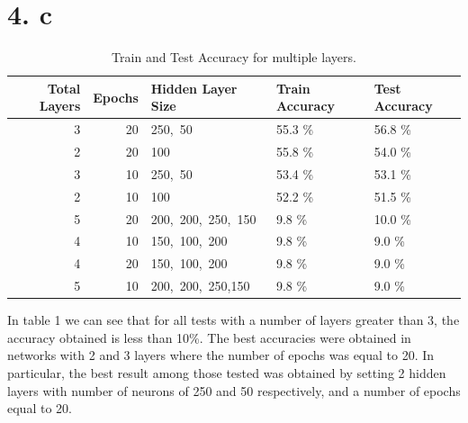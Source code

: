\documentclass[
	12pt, %
]{fphw}
\begin{document}
\section* {4. c}

\begin{table}[ht]
\begin{center}
\caption{Train and Test Accuracy for multiple layers.}
\begin{tabular}{rrlll}
\toprule
 Total Layers &  Epochs & Hidden Layer Size & Train Accuracy & Test Accuracy \\
\midrule
            3 &      20 &            250,\ 50 &         55.3 \% &        56.8 \% \\
            2 &      20 &               100 &         55.8 \% &        54.0 \% \\
            3 &      10 &            250,\ 50 &         53.4 \% &        53.1 \% \\
            2 &      10 &               100 &         52.2 \% &        51.5 \% \\
            5 &      20 &   200,\ 200,\ 250,\ 150 &          9.8 \% &        10.0 \% \\
            4 &      10 &       150,\ 100,\ 200 &          9.8 \% &         9.0 \% \\
            4 &      20 &       150,\ 100,\ 200 &          9.8 \% &         9.0 \% \\
            5 &      10 &   200,\ 200,\ 250,150 &          9.8 \% &         9.0 \% \\
\bottomrule
\end{tabular}
\end{center}
\end{table}

In table 1 we can see that for all tests with a number of layers greater than 3, the accuracy obtained is less than 10\%. The best accuracies were obtained in networks with 2 and 3 layers where the number of epochs was equal to 20. In particular, the best result among those tested was obtained by setting 2 hidden layers with number of neurons of 250 and 50 respectively, and a number of epochs equal to 20.









\end{document}
